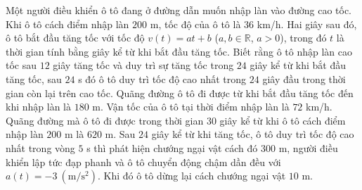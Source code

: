 \begin{ex}
Một người điều khiển ô tô đang ở đường dẫn muốn nhập làn vào đường cao tốc. Khi ô tô cách điểm nhập làn $200$ m, tốc độ của ô tô là $36$ km/h. Hai giây sau đó, ô tô bắt đầu tăng tốc với tốc độ $v(t)=at+b$ ($a,b\in\mathbb R$, $a>0$), trong đó $t$ là thời gian tính bằng giây kể từ khi bắt đầu tăng tốc. Biết rằng ô tô nhập làn cao tốc sau $12$ giây tăng tốc và duy trì sự tăng tốc trong $24$ giây kể từ khi bắt đầu tăng tốc, sau $24$ s đó ô tô duy trì tốc độ cao nhất trong $24$ giây đầu trong thời gian còn lại trên cao tốc.
\choiceTF
{\True Quãng đường ô tô đi được từ khi bắt đầu tăng tốc đến khi nhập làn là $180$ m.}
{\True Vận tốc của ô tô tại thời điểm nhập làn là $72$ km/h.}
{\True Quãng đường mà ô tô đi được trong thời gian $30$ giây kể từ khi ô tô cách điểm nhập làn $200$ m là $620$ m.}
{Sau $24$ giây kể từ khi tăng tốc, ô tô duy trì tốc độ cao nhất trong vòng $5$ s thì phát hiện chướng ngại vật cách đó $300$ m, người điều khiển lập tức đạp phanh và ô tô chuyển động chậm dần đều với $a(t)=-3\ (\mathrm{m/s^2})$. Khi đó ô tô dừng lại cách chướng ngại vật $10$ m.}
\end{ex}
